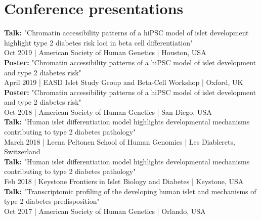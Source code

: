 \documentclass[letterpaper]{deedy-resume}
\begin{document}
\begin{minipage}[t]{0.66\textwidth}
		\sectionspace 
		
		
		
		\section{Conference presentations} 
	    \textbullet{}\textbf{Talk:} "Chromatin accessibility patterns of a hiPSC model of islet development highlight type 2 diabetes risk loci in beta cell differentiation" \\
	    {\footnotesize Oct 2019 | American Society of Human Genetics | Houston, USA\\}
	    \textbullet{}\textbf{Poster:} "Chromatin accessibility patterns of a hiPSC model of islet development and type 2 diabetes risk" \\
	    {\footnotesize April 2019 | EASD Islet Study Group and Beta-Cell Workshop | Oxford, UK\\}
	    \textbullet{}\textbf{Poster:} "Chromatin accessibility patterns of a hiPSC model of islet development and type 2 diabetes risk" \\
	    {\footnotesize Oct 2018 | American Society of Human Genetics | San Diego, USA\\}
	    \textbullet{}\textbf{Talk:} "Human islet differentiation model highlights developmental mechanisms contributing to type 2 diabetes pathology" \\
	    {\footnotesize March 2018 | Leena Peltonen School of Human Genomics | Les Diablerets, Switzerland\\}
	    \textbullet{}\textbf{Talk:} "Human islet differentiation model highlights developmental mechanisms contributing to type 2 diabetes pathology" \\
	    {\footnotesize Feb 2018 | Keystone Frontiers in Islet Biology and Diabetes | Keystone, USA\\}
		\textbullet{}\textbf{Talk:} "Transcriptomic profiling of the developing human islet and mechanisms of type 2 diabetes predisposition" \\
		{\footnotesize Oct 2017 | American Society of Human Genetics | Orlando, USA\\}

		\sectionspace 
		\sectionspace
		\sectionspace
		\sectionspace
		\sectionspace
	\end{minipage}
	\hfill
%
	
\end{document}

